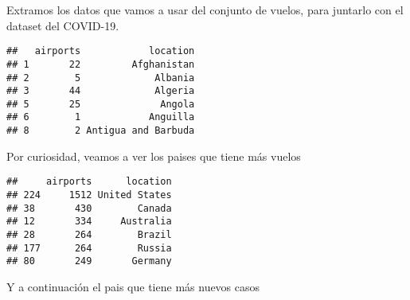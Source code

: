 \documentclass[
]{article}
\newenvironment{Shaded}{\begin{snugshade}}{\end{snugshade}}
\newcommand{\DecValTok}[1]{\textcolor[rgb]{0.86,0.86,0.80}{#1}}
\newcommand{\KeywordTok}[1]{\textcolor[rgb]{0.94,0.87,0.69}{#1}}
\newcommand{\NormalTok}[1]{\textcolor[rgb]{0.80,0.80,0.80}{#1}}
\newcommand{\OperatorTok}[1]{\textcolor[rgb]{0.94,0.94,0.82}{#1}}
\newcommand{\StringTok}[1]{\textcolor[rgb]{0.80,0.58,0.58}{#1}}
\begin{document}
Extramos los datos que vamos a usar del conjunto de vuelos, para
juntarlo con el dataset del COVID-19.

\begin{Shaded}
\end{Shaded}

\begin{verbatim}
##   airports            location
## 1       22         Afghanistan
## 2        5             Albania
## 3       44             Algeria
## 5       25              Angola
## 6        1            Anguilla
## 8        2 Antigua and Barbuda
\end{verbatim}

Por curiosidad, veamos a ver los paises que tiene más vuelos

\begin{Shaded}
\end{Shaded}

\begin{verbatim}
##     airports      location
## 224     1512 United States
## 38       430        Canada
## 12       334     Australia
## 28       264        Brazil
## 177      264        Russia
## 80       249       Germany
\end{verbatim}

Y a continuación el pais que tiene más nuevos casos

\begin{Shaded}
\end{Shaded}
\end{document}
